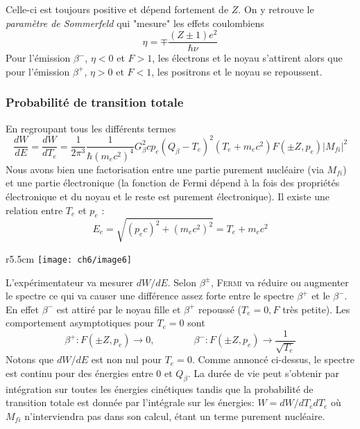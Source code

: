 Celle-ci est toujours positive et dépend fortement de $Z$.  On y retrouve le \textit{paramètre de Sommerfeld}
qui "mesure" les effets coulombiens
\begin{equation}
\eta = \mp \dfrac{(Z\pm 1)e^2}{\hbar \nu}
\end{equation}
Pour l'émission $\beta^-$, $\eta <0$ et $F>1$, les électrons et le noyau s'attirent alors que pour l'émission
$\beta^+$, $\eta >0$ et $F<1$, les positrons et le noyau se repoussent.


\newpage
\subsubsection{Probabilité de transition totale}
En regroupant tous les différents termes
\begin{equation}
\frac{dW}{dE} = \dfrac{dW}{dT_e} = \frac{1}{2\pi^3}\frac{1}{\hbar(m_ec^2)^4}G_\beta^2cp_e(Q_\beta-T_e)^2(T_e+
m_ec^2)F(\pm Z,p_e)|M_{fi}|^2
\end{equation}
Nous avons bien une factorisation entre une partie purement nucléaire (via $M_{fi}$) et une partie
électronique (la fonction de Fermi dépend à la fois des propriétés électronique et du  noyau et le reste est 
purement électronique). Il existe une relation entre $T_e$ et $p_e$ :
\begin{equation}
E_e = \sqrt{(p_ec)^2+(m_ec^2)^2} = T_e+m_ec^2
\end{equation}

	\begin{wrapfigure}[11]{r}{5.5cm}
	\vspace{-5mm}
	\texttt{[image: ch6/image6]}
	\end{wrapfigure}
L'expérimentateur va mesurer $dW/dE$. Selon $\beta^\pm$, \textsc{Fermi} va réduire ou augmenter le spectre ce 
qui va causer une différence assez forte entre le spectre $\beta^+$ et le $\beta^-$. En effet $\beta^-$ est 
attiré par le noyau fille et $\beta^+$ repoussé ($T_e=0, F$ très petite).  Les comportement asymptotiques pour
$T_e=0$ sont
\begin{equation}
\beta^+ : F(\pm Z, p_e)\to 0,\qquad\qquad \beta^- : F(\pm Z, p_e)\to \frac{1}{\sqrt{T_e}}
\end{equation}
Notons que $dW/dE$ est non nul pour $T_e=0$. Comme annoncé ci-dessus, le spectre est continu pour des énergies 
entre 0 et $Q_{\beta}$. La durée de vie peut s'obtenir par intégration sur toutes les énergies cinétiques tandis
que la probabilité de transition totale est donnée par l'intégrale sur les énergies: $W = dW/dT_edT_e$ où 
$M_{fi}$ n'interviendra pas dans son calcul, étant un terme purement nucléaire.



